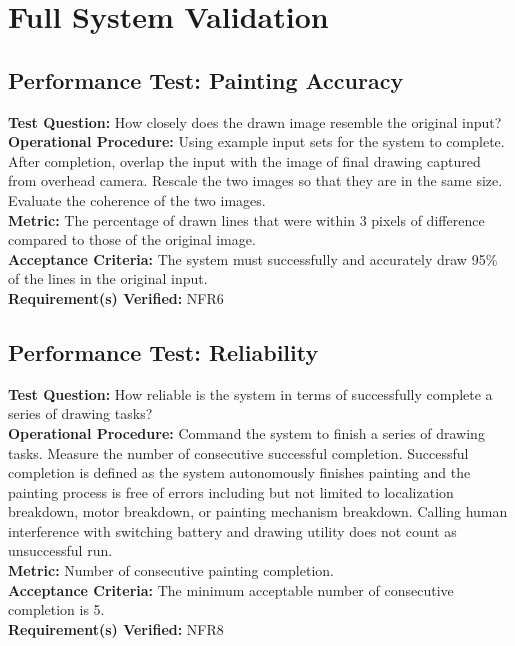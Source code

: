 
\section{Full System Validation}
\label{sec:system_validation}

\subsection{Performance Test: Painting Accuracy}
\label{test:sys_pt_accuracy}
\textbf{Test Question:} How closely does the drawn image resemble the original input?\\
\textbf{Operational Procedure:} Using example input sets for the system to complete. After completion, overlap the input with the image of final drawing captured from overhead camera. Rescale the two images so that they are in the same size. Evaluate the coherence of the two images.\\
\textbf{Metric:} The percentage of drawn lines that were within 3 pixels of difference compared to those of the original image.\\
\textbf{Acceptance Criteria:} The system must successfully and accurately draw 95\% of the lines in the original input.\\
\textbf{Requirement(s) Verified:} NFR6 \\

\subsection{Performance Test: Reliability}
\label{test:sys_pt_reliability}
\textbf{Test Question:} How reliable is the system in terms of successfully complete a series of drawing tasks?\\
\textbf{Operational Procedure:} Command the system to finish a series of drawing tasks. Measure the number of consecutive successful completion. Successful completion is defined as the system autonomously finishes painting and the painting process is free of errors including but not limited to localization breakdown, motor breakdown, or painting mechanism breakdown. Calling human interference with switching battery and drawing utility does not count as unsuccessful run.\\
\textbf{Metric:} Number of consecutive painting completion. \\
\textbf{Acceptance Criteria:} The minimum acceptable number of consecutive completion is 5.\\
\textbf{Requirement(s) Verified:} NFR8 \\

